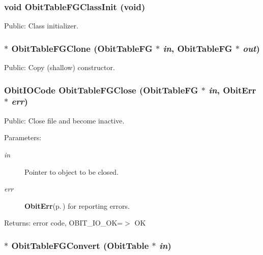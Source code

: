 \subsubsection{\setlength{\rightskip}{0pt plus 5cm}void Obit\-Table\-FGClass\-Init (void)}\label{ObitTableFG_8h_a10}


Public: Class initializer. 

\subsubsection{$\ast$ Obit\-Table\-FGClone ({\bf Obit\-Table\-FG} $\ast$ {\em in}, {\bf Obit\-Table\-FG} $\ast$ {\em out})}\label{ObitTableFG_8h_a15}


Public: Copy (shallow) constructor. 

\subsubsection{\setlength{\rightskip}{0pt plus 5cm}Obit\-IOCode Obit\-Table\-FGClose ({\bf Obit\-Table\-FG} $\ast$ {\em in}, {\bf Obit\-Err} $\ast$ {\em err})}\label{ObitTableFG_8h_a21}


Public: Close file and become inactive. 

\begin{Desc}
\item[Parameters:]
\begin{description}
\item[{\em in}]Pointer to object to be closed. \item[{\em err}]{\bf Obit\-Err}{\rm (p.\,\pageref{structObitErr})} for reporting errors. \end{description}
\end{Desc}
\begin{Desc}
\item[Returns:]error code, OBIT\_\-IO\_\-OK=$>$ OK \end{Desc}
\subsubsection{$\ast$ Obit\-Table\-FGConvert ({\bf Obit\-Table} $\ast$ {\em in})}\label{ObitTableFG_8h_a16}


